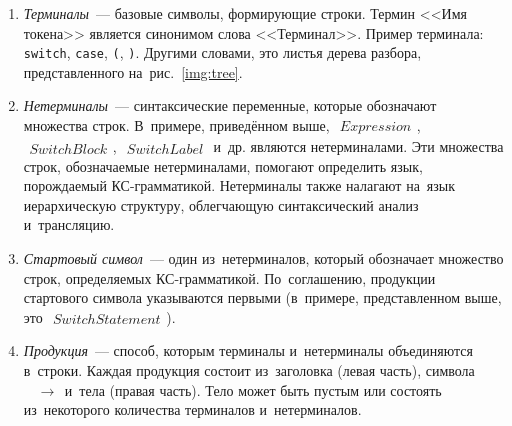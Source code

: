 \begin{enumerate} 
	\item{\textit{Терминалы}~--- базовые символы, формирующие строки. Термин <<Имя токена>> является синонимом слова <<Терминал>>. Пример терминала: \texttt{switch}, \texttt{case}, \texttt{(}, \texttt{)}}. Другими словами, это листья дерева разбора, представленного на~рис.~\ref{img:tree}.
	\item{\textit{Нетерминалы}~--- синтаксические переменные, которые обозначают множества строк. В~примере, приведённом выше, $\begin{aligned} Expression \end{aligned}$, $\begin{aligned} SwitchBlock \end{aligned}$, $\begin{aligned} SwitchLabel \end{aligned}$ и~др. являются нетерминалами. Эти множества строк, обозначаемые нетерминалами, помогают определить язык, порождаемый КС-грамматикой. Нетерминалы также налагают на~язык иерархическую структуру, облегчающую синтаксический анализ и~трансляцию.}
	\item{\textit{Стартовый символ}~--- один из~нетерминалов, который обозначает множество строк, определяемых КС-грамматикой. По~соглашению, продукции стартового символа указываются первыми (в~примере, представленном выше, это $\begin{aligned} SwitchStatement \end{aligned}$).}
	\item{\textit{Продукция}~--- способ, которым терминалы и~нетерминалы объединяются в~строки. Каждая продукция состоит из~заголовка (левая часть), символа $\begin{aligned} &\to \end{aligned}$ и~тела (правая часть). Тело может быть пустым или состоять из~некоторого количества терминалов и~нетерминалов.}
\end{enumerate}
